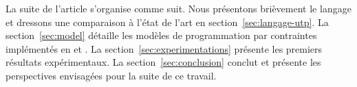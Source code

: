 La suite de l'article s'organise comme suit.
Nous présentons brièvement le langage {\UTP} et dressons une comparaison à l'état de l'art en section~\ref{sec:langage-utp}.
La section~\ref{sec:model} détaille les modèles de programmation par contraintes implémentés en {\MINIZINC} et {\CHR}.
La section~\ref{sec:experimentations} présente les premiers résultats expérimentaux.
La section~\ref{sec:conclusion} conclut et présente les perspectives envisagées pour la suite de ce travail.

